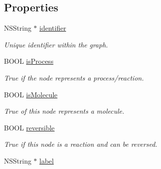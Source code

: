 \subsection*{Properties}
\begin{DoxyCompactItemize}
\item 
\hypertarget{interface_p_c_node_info_ad7f954ff41288b0a406763ffa3d5d4df}{
NSString $\ast$ \hyperlink{interface_p_c_node_info_ad7f954ff41288b0a406763ffa3d5d4df}{identifier}}
\label{interface_p_c_node_info_ad7f954ff41288b0a406763ffa3d5d4df}

\begin{DoxyCompactList}\small\item\em Unique identifier within the graph. \end{DoxyCompactList}\item 
\hypertarget{interface_p_c_node_info_a4f4c0d31e99c4b2e29a28b556df3e4f6}{
BOOL \hyperlink{interface_p_c_node_info_a4f4c0d31e99c4b2e29a28b556df3e4f6}{isProcess}}
\label{interface_p_c_node_info_a4f4c0d31e99c4b2e29a28b556df3e4f6}

\begin{DoxyCompactList}\small\item\em True if the node represents a process/reaction. \end{DoxyCompactList}\item 
\hypertarget{interface_p_c_node_info_ad73ca192b659ac9d859581ded337bdbc}{
BOOL \hyperlink{interface_p_c_node_info_ad73ca192b659ac9d859581ded337bdbc}{isMolecule}}
\label{interface_p_c_node_info_ad73ca192b659ac9d859581ded337bdbc}

\begin{DoxyCompactList}\small\item\em True of this node represents a molecule. \end{DoxyCompactList}\item 
\hypertarget{interface_p_c_node_info_aaf99591cc05a3ac8d5e8aa38f7ba1f75}{
BOOL \hyperlink{interface_p_c_node_info_aaf99591cc05a3ac8d5e8aa38f7ba1f75}{reversible}}
\label{interface_p_c_node_info_aaf99591cc05a3ac8d5e8aa38f7ba1f75}

\begin{DoxyCompactList}\small\item\em True if this node is a reaction and can be reversed. \end{DoxyCompactList}\item 
\hypertarget{interface_p_c_node_info_a24078dc5600262e224e5b9bd6d6e3c7e}{
NSString $\ast$ \hyperlink{interface_p_c_node_info_a24078dc5600262e224e5b9bd6d6e3c7e}{label}}
\label{interface_p_c_node_info_a24078dc5600262e224e5b9bd6d6e3c7e}


\end{DoxyCompactItemize}
